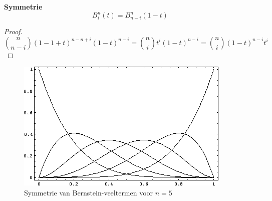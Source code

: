 \documentclass[computergesteund_ontwerp_van_curven_en_oppervlakken.tex]{subfiles}
\begin{document}
\begin{ei}
\textbf{Symmetrie}
\[
B_{i}^{n}(t) = B_{n-i}^{n}(1-t)
\]
\begin{proof}
\[
\binom{n}{n-i}(1-1+t)^{n-n+i}(1-t)^{n-i}
= \binom{n}{i}t^{i}(1-t)^{n-i}
= \binom{n}{i}(1-t)^{n-i}t^{i} 
\]
\end{proof}
\begin{figure}[H]
\centering
\includegraphics[scale=0.5]{illustraties/BernsteinPolynomial.png} 
\caption{Symmetrie van Bernstein-veeltermen voor $n=5$}
\end{figure}
\end{ei}
\end{document}
